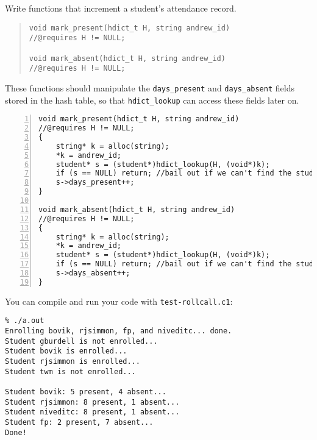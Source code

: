 \begin{part}
  Write functions that increment a student's attendance record.
\begin{quote}
\begin{lstlisting}
void mark_present(hdict_t H, string andrew_id)
//@requires H != NULL;

void mark_absent(hdict_t H, string andrew_id)
//@requires H != NULL;
\end{lstlisting}
\end{quote}
These functions should manipulate the \lstinline'days_present' and
\lstinline'days_absent' fields stored in the hash table, so that
\lstinline'hdict_lookup' can access these fields later on.

\threePT
\begin{solution}
\begin{lstlisting}[numbers=left, name="rollcall"]
void mark_present(hdict_t H, string andrew_id)
//@requires H != NULL;
{
    string* k = alloc(string);
    *k = andrew_id;
    student* s = (student*)hdict_lookup(H, (void*)k);
    if (s == NULL) return; //bail out if we can't find the student
    s->days_present++;
}

void mark_absent(hdict_t H, string andrew_id)
//@requires H != NULL;
{
    string* k = alloc(string);
    *k = andrew_id;
    student* s = (student*)hdict_lookup(H, (void*)k);
    if (s == NULL) return; //bail out if we can't find the student
    s->days_absent++;
}
\end{lstlisting}
\end{solution}
\end{part}

You can compile and run your code with \lstinline'test-rollcall.c1':
\begin{lstlisting}[language={[coin]C}]
% cc0 -d hdict.c1 rollcall.c1 test-rollcall.c1
% ./a.out
Enrolling bovik, rjsimmon, fp, and niveditc... done.
Student gburdell is not enrolled...
Student bovik is enrolled...
Student rjsimmon is enrolled...
Student twm is not enrolled...

Student bovik: 5 present, 4 absent...
Student rjsimmon: 8 present, 1 absent...
Student niveditc: 8 present, 1 absent...
Student fp: 2 present, 7 absent...
Done!
\end{lstlisting}
\enlargethispage{5ex}
